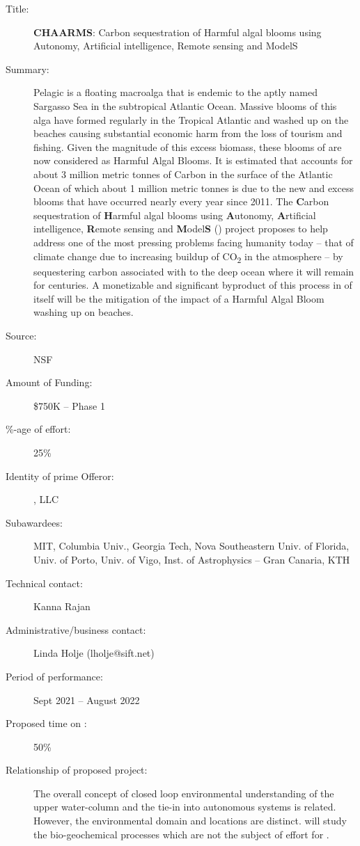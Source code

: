 \begin{description}

\item [Title:] \textbf{CHAARMS}: Carbon sequestration of Harmful algal
  blooms using Autonomy, Artificial intelligence, Remote sensing and
  ModelS

\item [Summary:] Pelagic \sar is a floating macroalga that is endemic to
  the aptly named Sargasso Sea in the subtropical Atlantic Ocean.
  Massive blooms of this alga have formed regularly in the Tropical
  Atlantic and washed up on the beaches causing substantial economic
  harm from the loss of tourism and fishing. Given the magnitude of this
  excess
  biomass, these blooms of \sar are now considered as Harmful Algal
  Blooms. It is estimated that \sar accounts for about 3 million metric
  tonnes of Carbon in the surface of the Atlantic Ocean of which about 1
  million metric tonnes is due to the new and excess blooms that have
  occurred nearly every year since 2011. The \textbf{C}arbon
  sequestration of \textbf{H}armful algal blooms using
  \textbf{A}utonomy, \textbf{A}rtificial intelligence, \textbf{R}emote
  sensing and \textbf{M}odel\textbf{S} (\projce) project proposes to help
  address one of the most pressing problems facing humanity today --
  that of climate change due to increasing buildup of
  CO\textsubscript{2} in the atmosphere -- by sequestering carbon
  associated with \sar to the deep ocean where it will remain for
  centuries. A monetizable and significant byproduct of this process in
  of itself will be the mitigation of the impact of a Harmful Algal
  Bloom washing up on beaches.

\item [Source:] NSF
\item [Amount of Funding:] \$750K -- Phase 1
\item [\%-age of effort:] 25\%  
\item [Identity of prime Offeror:] \orge, LLC
\item [Subawardees:] MIT, Columbia Univ., Georgia Tech, Nova
  Southeastern Univ. of Florida, Univ. of Porto, Univ. of Vigo, Inst. of
  Astrophysics -- Gran Canaria, KTH
\item [Technical contact:] Kanna Rajan
\item [Administrative/business contact:] Linda Holje (lholje@sift.net)
\item [Period of performance:] Sept 2021 -- August 2022
\item [Proposed time on \proje:] 50\%
\item [Relationship of proposed project:] The overall concept of closed
  loop environmental understanding of the upper water-column and the
  tie-in into autonomous systems is related. However, the environmental
  domain and locations are distinct. \proj will study the
  bio-geochemical processes which are not the subject of effort for \projce.
  
\end{description}
